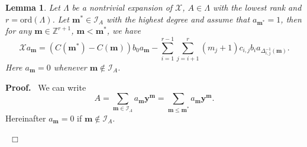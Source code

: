 \documentclass[preprint,12pt]{elsarticle}
\newtheorem{lem}[thm]{Lemma}
\newenvironment{proof}[1][Proof]{\textbf{#1.}\ }{\ $\Box$}
\begin{document}
\begin{lem}
\label{lem:a.9} Let $\Lambda$ be a nontrivial expansion of $\mathscr{X}$, $A\in \Lambda$ with the lowest rank and $r =
\mathrm{ord}(\Lambda) $. Let $\mathbf{m}^*\in \mathcal{I}_A$ with the
highest degree and assume that $a_{\mathbf{m}^*} = 1$, then for any $\mathbf{m}\in \mathbb{Z}^{r+1}$, $\mathbf{m}<\mathbf{m}^*$, we have
\begin{equation}
\label{eq:a.2} \mathscr{X}a_\mathbf{m} = (C({\mathbf{m}^*}) -
C({\mathbf{m}}))b_0a_{\mathbf{m}}
-\sum_{i=1}^{r-1}\sum_{j=i+1}^{r}(m_j+1)c_{i,j}b_ia_{{\Delta_{i,j}^{-1}}(\mathbf{m})}.
\end{equation}
Here $a_{\mathbf{m}} = 0$ whenever  $\mathbf{m}\not\in \mathcal{I}_A$.
\end{lem}
\begin{proof}
We can write 
$$A = \sum_{\mathbf{m}\in \mathcal{I}_A}a_{\mathbf{m}}\mathbf{y}^{\mathbf{m}} = \sum_{\mathbf{m} \leq \mathbf{m}^*} a_{\mathbf{m}} \mathbf{y}^{\mathbf{m}}.$$
Hereinafter $a_{\mathbf{m}} = 0$ if $\mathbf{m}\not\in \mathcal{I}_A$. 


\end{proof}
\end{document}
